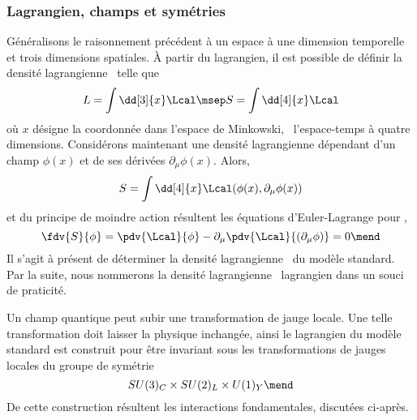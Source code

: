 \subsubsection{Lagrangien, champs et symétries}\label{chapter-MS-MSSM-section-formalisme-subsec-into_lagrangien-subsubsec-lagrangien_champs_symetries}
Généralisons le raisonnement précédent à un espace à une dimension temporelle et trois dimensions spatiales.
À partir du lagrangien, il est possible de définir la densité lagrangienne \Lcal\ telle que
\begin{equation}
L = \int\dd[3]{x}\Lcal
\msep
S = \int\dd[4]{x}\Lcal
\end{equation}
où $x$ désigne la coordonnée dans l'espace de Minkowski, \ie\ l'espace-temps à quatre dimensions.
Considérons maintenant une densité lagrangienne dépendant d'un champ $\phi(x)$ et de ses dérivées $\partial_\mu\phi(x)$.
Alors,
\begin{equation}
S = \int\dd[4]{x}\Lcal(\phi(x),\partial_\mu\phi(x))
\end{equation}
et du principe de moindre action résultent les équations d'Euler-Lagrange pour \Lcal,
\begin{equation}
\fdv{S}{\phi}
=
\pdv{\Lcal}{\phi} - \partial_\mu\pdv{\Lcal}{(\partial_\mu\phi)} = 0
\mend
\end{equation}
Il s'agit à présent de déterminer la densité lagrangienne \Lcal\ du modèle standard.
Par la suite, nous nommerons la densité lagrangienne \Lcal\ \og lagrangien \fg{} dans un souci de praticité.
\par Un champ quantique peut subir une transformation de jauge locale. Une telle transformation doit laisser la physique inchangée, ainsi le lagrangien du modèle standard est construit pour être invariant sous les transformations de jauges locales du groupe de symétrie
\begin{equation}
SU(3)_C \times SU(2)_L \times U(1)_Y
\mend
\label{eq-symmetries_lagrangien_SM}
\end{equation}
De cette construction résultent les interactions fondamentales, discutées ci-après.





